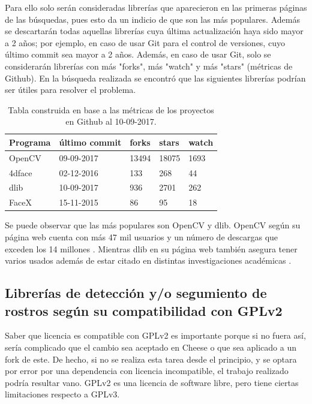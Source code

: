 \documentclass[a4paper,openright,12pt]{report}
\begin{document}
Para ello solo serán consideradas librerías que aparecieron en las primeras
páginas de las búsquedas, pues esto da un indicio de que son las más populares.
Además se descartarán todas aquellas librerías cuya última actualización haya
sido mayor a 2 años; por ejemplo, en caso de usar Git para el control de
versiones, cuyo último commit sea mayor a 2 años. Además, en caso de usar Git,
solo se considerarán librerías con más "forks", más "watch" y más "stars"
(métricas de Github). En la búsqueda realizada se encontró que las siguientes
librerías podrían ser útiles para resolver el problema.

\begin{center}
	\begin{table}[h]
  \begin{tabular}{| l | l | l | l | l |}
  \hline
  Programa & último commit & forks & stars & watch \\ \hline
  OpenCV & 09-09-2017 & 13494 & 18075 & 1693 \\ \hline
  4dface & 02-12-2016 & 133 & 268 & 44 \\ \hline
  dlib & 10-09-2017 & 936 & 2701 & 262 \\ \hline
  FaceX & 15-11-2015 & 86 & 95 & 18 \\ \hline
  \end{tabular}
  \caption{Tabla construida en base a las métricas de los proyectos en Github
           al 10-09-2017.}
	\end{table}
\end{center}

Se puede observar que las más populares son OpenCV y dlib. OpenCV según su
página web cuenta con más 47 mil usuarios y un número de descargas que exceden
los 14 millones \cite{OpenCV}. Mientras dlib en su página web también asegura
tener varios usados además de estar citado en distintas investigaciones
académicas \cite{dlibUsers}.

\subsection{Librerías de detección y/o segumiento de rostros según su
            compatibilidad con GPLv2}
Saber que licencia es compatible con GPLv2 es importante porque si no fuera así,
sería complicado que el cambio sea aceptado en Cheese o que sea aplicado a un
fork de este. De hecho, si no se realiza esta tarea desde el principio, y se
optara por error por una dependencia con licencia incompatible, el trabajo
realizado podría resultar vano. GPLv2 es una licencia de software libre, pero
tiene ciertas limitaciones respecto a GPLv3.
\end{document}

